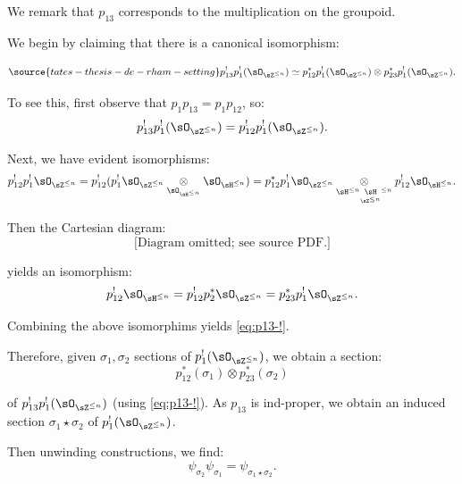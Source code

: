  We remark that $p_{13}$ corresponds to the multiplication
on the groupoid.

We begin by claiming that there is a canonical
isomorphism: %

\begin{equation}\label{eq:p13-!}
\source{tates-thesis-de-rham-setting}
p_{13}^!p_1^!(\sO_{\sZ^{\leq n}}) \simeq
p_{12}^*p_1^!(\sO_{\sZ^{\leq n}}) \otimes
p_{23}^*p_1^!(\sO_{\sZ^{\leq n}}).
\end{equation}

 To see this, first observe that
$p_1p_{13} = p_1p_{12}$, so:
%
\[
p_{13}^!p_1^!(\sO_{\sZ^{\leq n}}) =
p_{12}^!p_1^!(\sO_{\sZ^{\leq n}}).
\]

Next, we have evident isomorphisms:
%
\[
\begin{gathered}
p_{12}^!p_1^! \sO_{\sZ^{\leq n}} =
p_{12}^!(p_1^! \sO_{\sZ^{\leq n}}
\underset{\sO_{\sH^{\leq n}}}{\otimes}
\sO_{\sH^{\leq n}}) =
p_{12}^*p_1^! \sO_{\sZ^{\leq n}}
\underset{\sH^{\leq n} \underset{\sZ^{\leq n}} \sH^{\leq n} }
{\otimes}
p_{12}^!\sO_{\sH^{\leq n}}.
\end{gathered}
\]

 Then the Cartesian diagram:
%
\[
\text{[Diagram omitted; see source PDF.]}
\]

 yields an isomorphism: %
%
\[
p_{12}^!\sO_{\sH^{\leq n}} =
p_{12}^!p_2^*\sO_{\sZ^{\leq n}} =
p_{23}^*p_1^!\sO_{\sZ^{\leq n}}.
\]

 Combining the above isomorphims yields \eqref{eq:p13-!}.

Therefore, given $\sigma_1, \sigma_2$ sections of
$p_1^!(\sO_{\sZ^{\leq n}})$, we obtain a section:
%
\[
p_{12}^*(\sigma_1) \otimes p_{23}^*(\sigma_2)
\]

 of $p_{13}^!p_1^!(\sO_{\sZ^{\leq n}})$
(using \eqref{eq:p13-!}). As $p_{13}$ is ind-proper,
we obtain an induced section $\sigma_1 \star \sigma_2$
of $p_1^!(\sO_{\sZ^{\leq n}})$.

Then unwinding constructions, we find:
%
\[
\psi_{\sigma_2} \psi_{\sigma_1} = \psi_{\sigma_1 \star \sigma_2}.
\]


\subsubsection{}\label{ss:h-embed}

